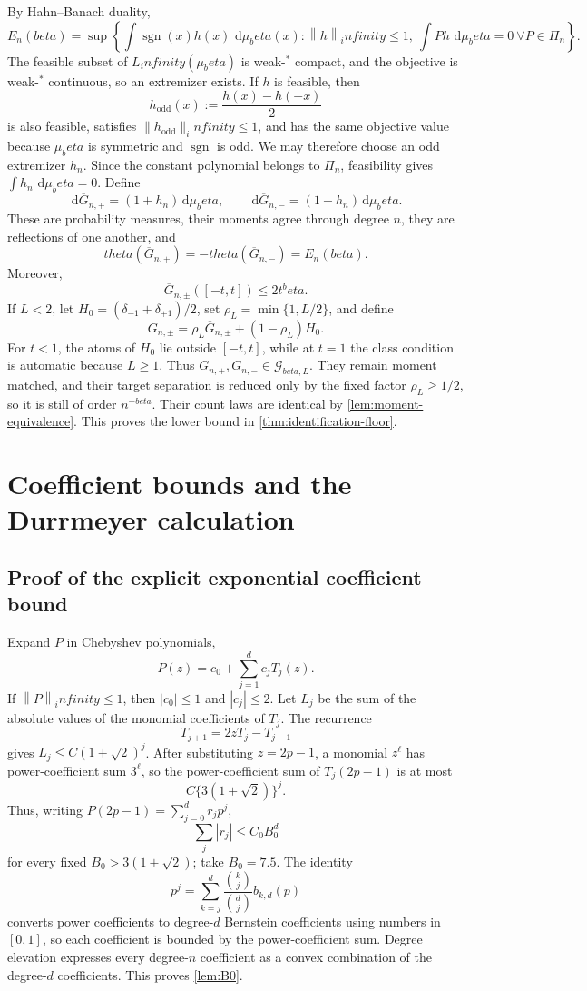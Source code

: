 \documentclass[11pt]{article}
\def\beta{beta}%
\def\theta{theta}%
\def\infty{infinity}%
\newcommand{\sgn}{\operatorname{sgn}}
\newcommand{\calG}{\mathcal G}
\newcommand{\norm}[1]{\left\lVert#1\right\rVert}
\newcommand{\dd}{\,\mathrm d}
\begin{document}
By Hahn--Banach duality,
\[
E_n(\beta)
=
\sup\left\{
\int\sgn(x)h(x)\,\dd\mu_\beta(x):
\norm h_\infty\le1,
\ \int P h\,\dd\mu_\beta=0\ \forall P\in\Pi_n
\right\}.
\]
The feasible subset of $L_\infty(\mu_\beta)$ is weak-$^*$ compact, and the objective is weak-$^*$ continuous, so an extremizer exists.  If $h$ is feasible, then
\[
h_{\mathrm{odd}}(x):=\frac{h(x)-h(-x)}2
\]
is also feasible, satisfies $\|h_{\mathrm{odd}}\|_\infty\le1$, and has the same objective value because $\mu_\beta$ is symmetric and $\sgn$ is odd.  We may therefore choose an odd extremizer $h_n$.  Since the constant polynomial belongs to $\Pi_n$, feasibility gives $\int h_n\,\dd\mu_\beta=0$.  Define
\[
\dd \overline G_{n,+}=(1+h_n)\dd\mu_\beta,
\qquad
\dd \overline G_{n,-}=(1-h_n)\dd\mu_\beta.
\]
These are probability measures, their moments agree through degree $n$, they are reflections of one another, and
\[
\theta(\overline G_{n,+})
=-\theta(\overline G_{n,-})
=E_n(\beta).
\]
Moreover,
\[
\overline G_{n,\pm}([-t,t])\le2t^\beta.
\]
If $L<2$, let $H_0=(\delta_{-1}+\delta_{+1})/2$, set $\rho_L=\min\{1,L/2\}$, and define
\[
G_{n,\pm}=\rho_L\overline G_{n,\pm}+(1-\rho_L)H_0.
\]
For $t<1$, the atoms of $H_0$ lie outside $[-t,t]$, while at $t=1$ the class condition is automatic because $L\ge1$.  Thus $G_{n,+},G_{n,-}\in\calG_{\beta,L}$.  They remain moment matched, and their target separation is reduced only by the fixed factor $\rho_L\ge1/2$, so it is still of order $n^{-\beta}$.  Their count laws are identical by \cref{lem:moment-equivalence}.  This proves the lower bound in \cref{thm:identification-floor}.

\section{Coefficient bounds and the Durrmeyer calculation}
\label{app:coefficients}

\subsection{Proof of the explicit exponential coefficient bound}

Expand $P$ in Chebyshev polynomials,
\[
P(z)=c_0+\sum_{j=1}^dc_jT_j(z).
\]
If $\norm P_\infty\le1$, then $|c_0|\le1$ and $|c_j|\le2$.  Let $L_j$ be the sum of the absolute values of the monomial coefficients of $T_j$.  The recurrence
\[
T_{j+1}=2zT_j-T_{j-1}
\]
gives $L_j\le C(1+\sqrt2)^j$.  After substituting $z=2p-1$, a monomial $z^\ell$ has power-coefficient sum $3^\ell$, so the power-coefficient sum of $T_j(2p-1)$ is at most
\[
C\{3(1+\sqrt2)\}^j.
\]
Thus, writing $P(2p-1)=\sum_{j=0}^dr_jp^j$,
\[
\sum_j|r_j|\le C_0B_0^d
\]
for every fixed $B_0>3(1+\sqrt2)$; take $B_0=7.5$.  The identity
\[
p^j
=
\sum_{k=j}^d
\frac{\binom kj}{\binom dj}b_{k,d}(p)
\]
converts power coefficients to degree-$d$ Bernstein coefficients using numbers in $[0,1]$, so each coefficient is bounded by the power-coefficient sum.  Degree elevation expresses every degree-$n$ coefficient as a convex combination of the degree-$d$ coefficients.  This proves \cref{lem:B0}.
\end{document}
